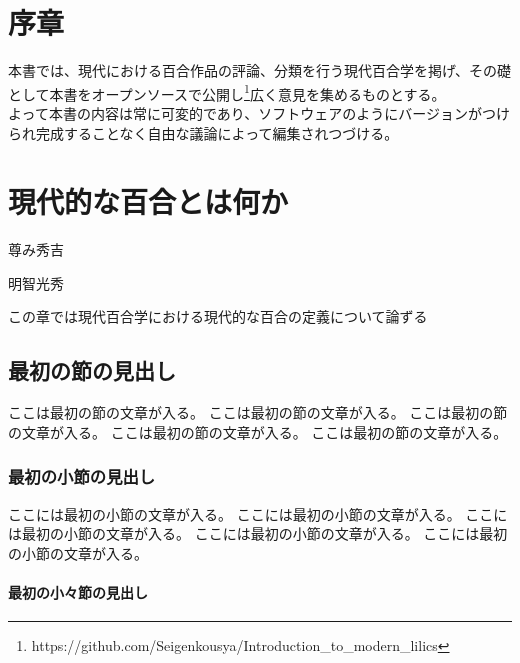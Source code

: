 \documentclass[ %
	uplatex,%
	a5paper,%
	papersize%
	]{jsbook}
\begin{document}
						\pagecolor{white}
						\color{black}
						\frontmatter

						\chapter{序章}

						本書では、現代における百合作品の評論、分類を行う現代百合学を掲げ、その礎として本書をオープンソースで公開し\footnote{https://github.com/Seigenkousya/Introduction\_to\_modern\_lilics}広く意見を集めるものとする。\\
						よって本書の内容は常に可変的であり、ソフトウェアのようにバージョンがつけられ完成することなく自由な議論によって編集されつづける。

						\tableofcontents %

						\mainmatter

						\chapter{現代的な百合とは何か}

						\epigraph{尊み秀吉}{明智光秀}

						\begin{summary}
							この章では現代百合学における現代的な百合の定義について論ずる
						\end{summary}

						\section{最初の節の見出し}

						ここは最初の節の文章が入る。
						ここは最初の節の文章が入る。
						ここは最初の節の文章が入る。
						ここは最初の節の文章が入る。
						ここは最初の節の文章が入る。

						\subsection{最初の小節の見出し}

						ここには最初の小節の文章が入る。
						ここには最初の小節の文章が入る。
						ここには最初の小節の文章が入る。
						ここには最初の小節の文章が入る。
						ここには最初の小節の文章が入る。

						\subsubsection{最初の小々節の見出し}
\end{document}
